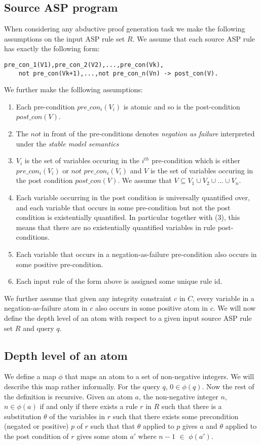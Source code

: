 \documentclass[sigconf]{acmart}
\begin{document}
\subsection{Source ASP program}

When considering any abductive proof generation task we make the following assumptions on the input ASP rule set $R$. We assume that each source ASP rule has exactly the following form:
\begin{lstlisting}[frame=none]
pre_con_1(V1),pre_con_2(V2),...,pre_con(Vk),
    not pre_con(Vk+1),...,not pre_con_n(Vn) -> post_con(V).
\end{lstlisting}
We further make the folllowing assumptions:

\begin{enumerate}
    \item Each pre-condition $pre\_con_{i}(V_{i})$ is atomic and so is the post-condition $post\_con(V)$.
    \item The $not$ in front of the pre-conditions denotes \textit{negation as failure} interpreted under the \textit{stable model semantics}
    \item $V_{i}$ is the set of variables occuring in the $i^{th}$ pre-condition which is either $pre\_con_{i}(V_{i})$ or $not$ $pre\_con_{i}(V_{i})$ and $V$ is the set of variables occuring in the post condition $post\_con(V)$. We assume that $V\subseteq V_{1}\cup V_{2}\cup ... \cup V_{n}$.
    \item Each variable occurring in the post condition is universally quantified over, and each variable that occurs in some pre-condition but not the post condition is existentially quantified. In particular together with (3), this means that there are no existentially quantified variables in rule post-conditions.
    \item Each variable that occurs in a negation-as-failure pre-condition also occurs in some positive pre-condition.
    \item Each input rule of the form above is assigned some unique rule id.
\end{enumerate}

We further assume that given any integrity constraint $c$ in $C$, every variable in a negation-as-failure atom in $c$ also occurs in some positive atom in $c$. We will now define the depth level of an atom with respect to a given input source ASP rule set $R$ and query $q$.

\subsection{Depth level of an atom}
We define a map $\phi$ that maps an atom to a set of non-negative integers. We
will describe this map rather informally. For the query $q$, $0\in
\phi(q)$. Now the rest of the definition is recursive. Given an atom $a$, the
non-negative integer $n$, $n\in \phi(a)$ if and only if there exists a rule
$r$ in $R$ such that there is a substitution $\theta$ of the variables in $r$
such that there exists some precondition (negated or positive) $p$ of $r$ such
that that $\theta$ applied to $p$ gives $a$ and $\theta$ applied to the post
condition of $r$ gives some atom $a'$ where $n-1$ $\in$ $\phi(a')$.
\end{document}

